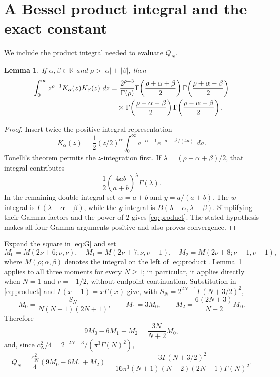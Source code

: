 \documentclass[11pt]{article}
\newtheorem{lemma}[theorem]{Lemma}
\newcommand{\R}{\mathbb R}
\newcommand{\dd}{\,d}
\begin{document}
\section{A Bessel product integral and the exact constant}

We include the product integral needed to evaluate $Q_N$.

\begin{lemma}\label{lem:product}
If $\alpha,\beta\in\R$ and $\rho>|\alpha|+|\beta|$, then
\begin{align}
 \int_0^\infty z^{\rho-1}K_\alpha(z)K_\beta(z)\,\dd z
 &=\frac{2^{\rho-3}}{\Gamma(\rho)}
 \Gamma\!\left(\frac{\rho+\alpha+\beta}{2}\right)
 \Gamma\!\left(\frac{\rho+\alpha-\beta}{2}\right)\notag\\
 &\quad\times
 \Gamma\!\left(\frac{\rho-\alpha+\beta}{2}\right)
 \Gamma\!\left(\frac{\rho-\alpha-\beta}{2}\right).
 \label{eq:product}
\end{align}
\end{lemma}

\begin{proof}
Insert twice the positive integral representation
\[
 K_\alpha(z)=\frac12(z/2)^\alpha
 \int_0^\infty a^{-\alpha-1}e^{-a-z^2/(4a)}\,\dd a.
\]
Tonelli's theorem permits the $z$-integration first.  If
$\lambda=(\rho+\alpha+\beta)/2$, that integral contributes
\[
 \frac12\left(\frac{4ab}{a+b}\right)^\lambda\Gamma(\lambda).
\]
In the remaining double integral set $w=a+b$ and $y=a/(a+b)$.  The
$w$-integral is
$\Gamma(\lambda-\alpha-\beta)$, while the $y$-integral is
$B(\lambda-\alpha,\lambda-\beta)$.  Simplifying their Gamma factors and
the power of $2$ gives \eqref{eq:product}.  The stated hypothesis makes all
four Gamma arguments positive and also proves convergence.
\end{proof}

Expand the square in \eqref{eq:G} and set
\[
 M_0=M(2\nu+6;\nu,\nu),\quad
 M_1=M(2\nu+7;\nu,\nu-1),\quad
 M_2=M(2\nu+8;\nu-1,\nu-1),
\]
where $M(\rho;\alpha,\beta)$ denotes the integral on the left of
\eqref{eq:product}.  Lemma~\ref{lem:product} applies to all three moments for
every $N\geq1$; in particular, it applies directly when $N=1$ and
$\nu=-1/2$, without endpoint continuation.  Substitution in
\eqref{eq:product} and $\Gamma(x+1)=x\Gamma(x)$ give, with
$S_N=2^{2N-1}\Gamma(N+3/2)^2$,
\begin{equation}\label{eq:moments}
 M_0=\frac{S_N}{N(N+1)(2N+1)},\qquad
 M_1=3M_0,\qquad
 M_2=\frac{6(2N+3)}{N+2}M_0.
\end{equation}
Therefore
\[
 9M_0-6M_1+M_2=\frac{3N}{N+2}M_0,
\]
and, since $c_N^2/4=2^{-2N-3}/(\pi^3\Gamma(N)^2)$,
\begin{equation}\label{eq:Q}
 Q_N=\frac{c_N^2}{4}(9M_0-6M_1+M_2)
 =\frac{3\Gamma(N+3/2)^2}
 {16\pi^3(N+1)(N+2)(2N+1)\Gamma(N)^2}.
\end{equation}
\end{document}
